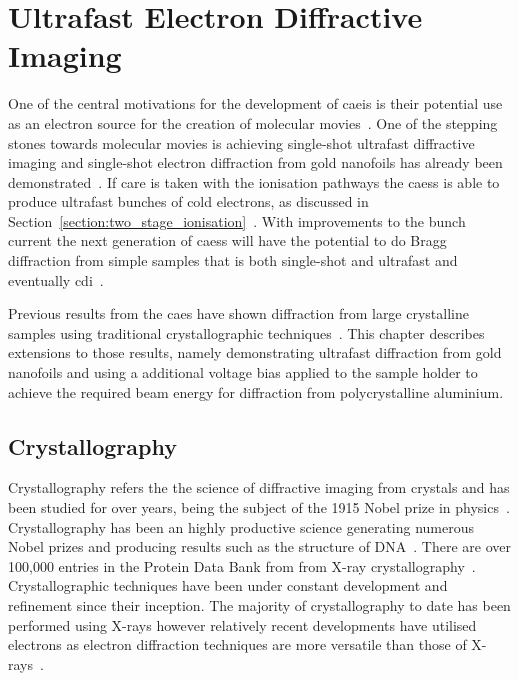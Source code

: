 \chapter{Ultrafast Electron Diffractive Imaging}\label{chapter:diffraction}

One of the central motivations for the development of \gls{caeis} is their potential use as an electron source for the creation of molecular movies~\cite{van_der_geer_ultracold_2009}.
One of the stepping stones towards molecular movies is achieving single-shot ultrafast diffractive imaging and single-shot electron diffraction from gold nanofoils has already been demonstrated~\cite{speirs_single-shot_2015}.
If care is taken with the ionisation pathways the \glspl{caes} is able to produce ultrafast bunches of cold electrons, as discussed in Section~\ref{section:two_stage_ionisation}~\cite{speirs_single-shot_2015,speirs_identification_2017,speirs_electron_2017}.
With improvements to the bunch current the next generation of \glspl{caes} will have the potential to do Bragg diffraction from simple samples that is both single-shot and ultrafast and eventually \gls{cdi}~\cite{mcculloch_cold_2016}.

Previous results from the \gls{caes} have shown diffraction from large crystalline samples using traditional crystallographic techniques~\cite{speirs_single-shot_2015,speirs_electron_2017}.
This chapter describes extensions to those results, namely demonstrating ultrafast diffraction from gold nanofoils and using a additional voltage bias applied to the sample holder to achieve the required beam energy for diffraction from polycrystalline aluminium.

\section{Crystallography}

Crystallography refers the the science of diffractive imaging from crystals and has been studied for over \unit[100]{years}, being the subject of the 1915 Nobel prize in physics~\cite{bragg_structure_1913}.
Crystallography has been an highly productive science generating numerous Nobel prizes and producing results such as the structure of DNA~\cite{franklin_structure_1953,dennis_eternal_2003}.
There are over 100,000 entries in the Protein Data Bank from from X-ray crystallography~\cite{noauthor_pdb_nodate}.
Crystallographic techniques have been under constant development and refinement since their inception.
The majority of crystallography to date has been performed using X-rays however relatively recent developments have utilised electrons as electron diffraction techniques are more versatile than those of X-rays~\cite{cowley_electron_1992}.

